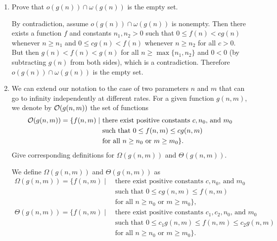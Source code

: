 \documentclass[Chapter03]{subfiles}
\begin{document}
\begin{enumerate}
		\item Prove that $o(g(n)) \cap \omega(g(n))$ is the empty set.
		\begin{answer}
			By contradiction, assume $o(g(n)) \cap \omega(g(n))$ is nonempty. Then there exists a function $f$ and constants $n_1,n_2 > 0$ such that $0 \leq f(n) < cg(n)$ whenever $n \geq n_1$ and $0 \leq cg(n) < f(n)$ whenever $n \geq n_2$ for all $c > 0$. But then $g(n) < f(n) < g(n)$ for all $n \geq \max\{n_1,n_2\}$ and $0 < 0$ (by subtracting $g(n)$ from both sides), which is a contradiction. Therefore $o(g(n)) \cap \omega(g(n))$ is the empty set.
		\end{answer}

		\item We can extend our notation to the case of two parameters $n$ and $m$ that can go to infinity independently at different rates. For a given function $g(n,m)$, we denote by $\mathcal{O}(g(n,m))$ the set of functions
		\begin{align*}
			\mathcal{O}(g(n,m)) = \{ f(n,m) \mid\ &\text{there exist positive constants $c, n_0$, and $m_0$}\\
				&\text{such that $0 \leq f(n,m) \leq cg(n,m)$}\\
				&\text{for all $n \geq n_0$ or $m \geq m_0$}\}.
		\end{align*}
		Give corresponding definitions for $\Omega(g(n,m))$ and $\Theta(g(n,m))$.
		\begin{answer}
			We define $\Omega(g(n,m))$ and $\Theta(g(n,m))$ as
			\begin{align*}
				\Omega(g(n,m)) = \{ f(n,m) \mid\ &\text{there exist positive constants $c, n_0$, and $m_0$}\\
					&\text{such that $0 \leq cg(n,m) \leq f(n,m)$}\\
					&\text{for all $n \geq n_0$ or $m \geq m_0$}\},\\
				\Theta(g(n,m)) = \{ f(n,m) \mid\ &\text{there exist positive constants $c_1, c_2, n_0$, and $m_0$}\\
					&\text{such that $0 \leq c_1g(n,m) \leq f(n,m) \leq c_2g(n,m)$}\\
					&\text{for all $n \geq n_0$ or $m \geq m_0$}\}.
			\end{align*}
		\end{answer}

	\end{enumerate}
\end{document}
